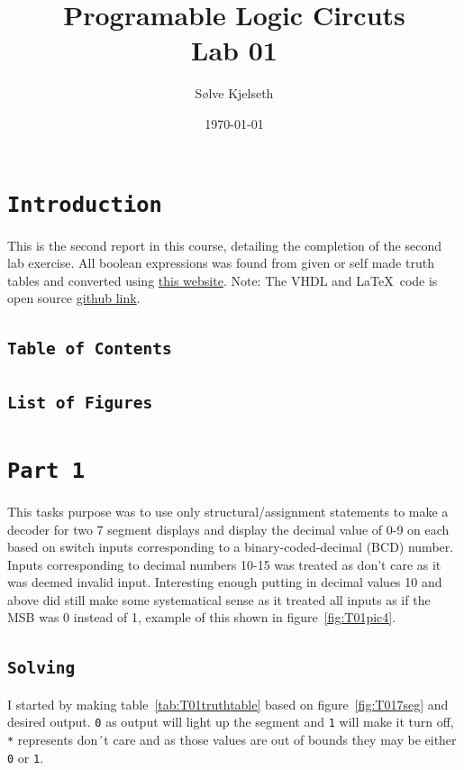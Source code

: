\documentclass{article}
\title{\fontsize{24}{36}\selectfont Programable Logic Circuts\\ %
Lab 01} %
\author{Sølve Kjelseth} %
\date{\today} %
\makeatletter
\let\oldsection\section
\renewcommand{\section}[1]{%
  \oldsection{\texttt{#1}} %
  \setcounter{subsection}{-1} %
  \setcounter{figure}{-1} %
  \setcounter{table}{-1} %
}
\let\oldsubsection\subsection
\renewcommand{\subsection}[1]{%
  \oldsubsection{\texttt{#1}}%
  \setcounter{subsubsection}{-1}%
}
\renewcommand{\tableofcontents}{%
    \subsection{Table of Contents} %
    \@starttoc{toc}%
}
\renewcommand{\listoffigures}{%
    \subsection{List of Figures} %
    \@starttoc{lof}%
}
\makeatother
\begin{document}
\maketitle %




\section{Introduction} %
This is the second report in this course, detailing the completion of the second lab exercise. All boolean expressions was found from given or self made truth tables and converted using
\href{https://tma.main.jp/logic/index_en.html}{this website}.
Note: The VHDL and \LaTeX\ code is open source
\href{https://github.com/Kjelseth/PLK_lab.git}{github link}.
\tableofcontents %
\listoffigures %

\section{Part 1}
This tasks purpose was to use only structural/assignment statements to make a decoder for two 7 segment displays and display the decimal value of 0-9 on each based on switch inputs corresponding to a binary-coded-decimal (BCD) number. Inputs corresponding to decimal numbers 10-15 was treated as don't care as it was deemed invalid input. Interesting enough putting in decimal values 10 and above did still make some systematical sense as it treated all inputs as if the MSB was 0 instead of 1, example of this shown in figure~\ref{fig:T01pic4}.


\subsection{Solving}
I started by making table~\ref{tab:T01truthtable} based on figure~\ref{fig:T017seg} and desired output. \verb|0| as output will light up the segment and \verb|1| will make it turn off, \verb|*| represents don´t care and as those values are out of bounds they may be either \verb|0| or \verb|1|.
\end{document}
